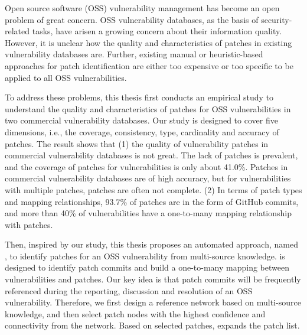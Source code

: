 \begin{abstract*}
Open source software (OSS) vulnerability management has become an open problem of great concern. %
OSS vulnerability databases, as the basis of security-related tasks, have arisen a growing concern about their information quality. However, it is unclear how the quality and characteristics of patches in existing vulnerability databases are. Further, existing manual or heuristic-based approaches for patch identification are either too expensive or too specific to be applied to all OSS vulnerabilities.

To address these problems, this thesis first conducts an empirical study to understand the quality and characteristics of patches for OSS vulnerabilities in two commercial vulnerability databases. Our study is designed to cover five dimensions, i.e., the coverage, consistency, type, cardinality and accuracy of patches. The result shows that (1) the quality of vulnerability patches in commercial vulnerability databases is not great. The lack of patches is prevalent, and the coverage of patches for vulnerabilities is only about 41.0\%. Patches in commercial vulnerability databases are of high accuracy, but for vulnerabilities with multiple patches, patches are often not complete. (2) In terms of patch types and mapping relationships, 93.7\% of patches are in the form of GitHub commits, and more than 40\% of vulnerabilities have a one-to-many mapping relationship with patches.

Then, inspired by our study, this thesis proposes an automated approach, named \tool, to identify patches for an OSS vulnerability from multi-source knowledge. \tool is designed to identify patch commits and build a one-to-many mapping between vulnerabilities and patches. Our key idea is that patch commits will be frequently referenced during the reporting, discussion and resolution of an OSS vulnerability. Therefore, we first design a reference network based on multi-source knowledge, and then select patch nodes with the highest confidence and connectivity from the network. Based on selected patches, \tool expands the patch list.


\end{abstract*}
